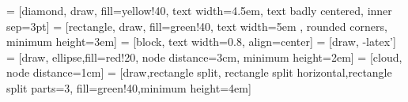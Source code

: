 \usepackage{latexsym,multicol,color,pstricks}

\headheight 15pt

 = [diamond, draw, fill=yellow!40, text width=4.5em, text badly centered, inner sep=3pt]
 = [rectangle, draw, fill=green!40, text width=5em	, rounded corners, minimum height=3em]
 = [block, text width=0.8\textwidth, align=center]
 = [draw, -latex']
 = [draw, ellipse,fill=red!20, node distance=3cm, minimum height=2em]
 = [cloud, node distance=1cm]
 = [draw,rectangle split, rectangle split horizontal,rectangle split parts=3, fill=green!40,minimum height=4em]

\overfullrule=2cm

